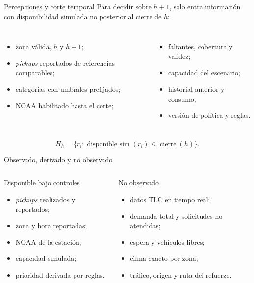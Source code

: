 \documentclass[aspectratio=169,11pt]{beamer}
\begin{document}
\begin{frame}{Percepciones y corte temporal}
  Para decidir sobre $h+1$, solo entra información con disponibilidad simulada no posterior al cierre de $h$:
  \begin{columns}[T]
      \begin{itemize}
        \item zona válida, $h$ y $h+1$;
        \item \textit{pickups} reportados de referencias comparables;
        \item categorías con umbrales prefijados;
        \item NOAA habilitado hasta el corte;
      \end{itemize}
      \begin{itemize}
        \item faltantes, cobertura y validez;
        \item capacidad del escenario;
        \item historial anterior y consumo;
        \item versión de política y reglas.
      \end{itemize}
  \end{columns}
  \[
    H_h=\{r_i:\operatorname{disponible\_sim}(r_i)\leq\operatorname{cierre}(h)\}.
  \]
\end{frame}

\begin{frame}{Observado, derivado y no observado}
  \small
  \begin{columns}[T]
      \begin{block}{Disponible bajo controles}
        \begin{itemize}
          \item \textit{pickups} realizados y reportados;
          \item zona y hora reportadas;
          \item NOAA de la estación;
          \item capacidad simulada;
          \item prioridad derivada por reglas.
        \end{itemize}
      \end{block}
      \begin{alertblock}{No observado}
        \begin{itemize}
          \item datos TLC en tiempo real;
          \item demanda total y solicitudes no atendidas;
          \item espera y vehículos libres;
          \item clima exacto por zona;
          \item tráfico, origen y ruta del refuerzo.
        \end{itemize}
      \end{alertblock}
  \end{columns}
\end{frame}
\end{document}
